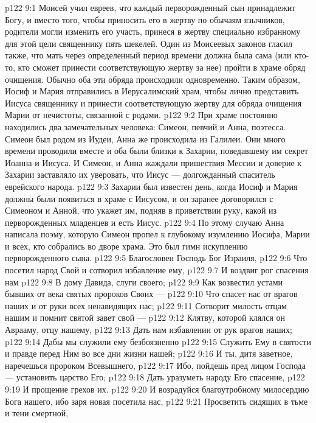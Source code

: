 \vs p122 9:1 Моисей учил евреев, что каждый перворожденный сын принадлежит Богу, и вместо того, чтобы приносить его в жертву по обычаям язычников, родители могли изменить его участь, принеся в жертву специально избранному для этой цели священнику пять шекелей. Один из Моисеевых законов гласил также, что мать через определенный период времени должна была сама (или кто\hyp{}то, кто сможет принести соответствующую жертву за нее) пройти в храме обряд очищения. Обычно оба эти обряда происходили одновременно. Таким образом, Иосиф и Мария отправились в Иерусалимский храм, чтобы лично представить Иисуса священнику и принести соответствующую жертву для обряда очищения Марии от нечистоты, связанной с родами.
\vs p122 9:2 \pc При храме постоянно находились два замечательных человека: Симеон, певчий и Анна, поэтесса. Симеон был родом из Иудеи, Анна же происходила из Галилеи. Они много времени проводили вместе и оба были близки к Захарии, поведавшему им секрет Иоанна и Иисуса. И Симеон, и Анна жаждали пришествия Мессии и доверие к Захарии заставляло их уверовать, что Иисус --- долгожданный спаситель еврейского народа.
\vs p122 9:3 Захарии был известен день, когда Иосиф и Мария должны были появиться в храме с Иисусом, и он заранее договорился с Симеоном и Анной, что укажет им, подняв в приветствии руку, какой из перворожденных младенцев и есть Иисус.
\vs p122 9:4 По этому случаю Анна написала поэму, которую Симеон пропел к глубокому изумлению Иосифа, Марии и всех, кто собрались во дворе храма. Это был гимн искуплению перворожденного сына.
\vs p122 9:5 Благословен Господь Бог Израиля,
\vs p122 9:6 Что посетил народ Свой и сотворил избавление ему,
\vs p122 9:7 И воздвиг рог спасения нам
\vs p122 9:8 В дому Давида, слуги своего;
\vs p122 9:9 Как возвестил устами бывших от века святых пророков Своих ---
\vs p122 9:10 Что спасет нас от врагов наших и от руки всех ненавидящих нас;
\vs p122 9:11 Сотворит милость отцам нашим и помнит святой завет свой ---
\vs p122 9:12 Клятву, которой клялся он Аврааму, отцу нашему,
\vs p122 9:13 Дать нам избавлении от рук врагов наших;
\vs p122 9:14 Дабы мы служили ему безбоязненно
\vs p122 9:15 Служить Ему в святости и правде перед Ним во все дни жизни нашей;
\vs p122 9:16 И ты, дитя заветное, наречешься пророком Всевышнего,
\vs p122 9:17 Ибо, пойдешь пред лицом Господа --- установить царство Его;
\vs p122 9:18 Дать уразуметь народу Его спасение,
\vs p122 9:19 И прощение грехов их.
\vs p122 9:20 И возрадуйся благоутробному милосердию Бога нашего, ибо заря новая посетила нас,
\vs p122 9:21 Просветить сидящих в тьме и тени смертной,
